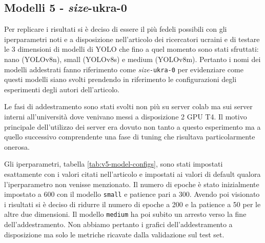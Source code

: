 \subsection*{Modelli 5 - \textit{size}-ukra-0}


Per replicare i risultati si è deciso di essere il più fedeli possibili con gli iperparametri 
noti e a disposizione nell'articolo dei ricercatori ucraini e di testare le 3 dimensioni di modelli
di YOLO che fino a quel momento sono stati sfruttati: nano (YOLOv8n), small (YOLOv8s) e medium (YOLOv8m).
Pertanto i nomi dei modelli addestrati fanno riferimento come \textit{size}\texttt{-ukra-0} per 
evidenziare come questi modelli siano svolti prendendo in riferimento le configurazioni degli 
esperimenti degli autori dell'articolo.

Le fasi di addestramento sono stati svolti non più su server colab ma sui server interni 
all'università dove venivano messi a disposizione 2 GPU T4. Il motivo principale dell'utilizzo dei 
server era dovuto non tanto a questo esperimento ma a quello successivo comprendente una fase di 
tuning che risultava particolarmente onerosa.

Gli iperparametri, tabella \ref{tab:v5-model-configs}, sono stati impostati esattamente con i valori citati nell'articolo e impostati
ai valori di default qualora l'iperparametro non venisse menzionato. Il numero di epoche è stato inizialmente
impostato a 600 con il modello \texttt{small} e patience pari a 300. Avendo poi visionato i 
risultati si è deciso di ridurre il numero di epoche a 200 e la patience a 50 per le altre due 
dimensioni. Il modello \texttt{medium} ha poi subito un arresto verso la fine dell'addestramento. Non 
abbiamo pertanto i grafici dell'addestramento a disposizione ma solo le metriche ricavate dalla validazione
sul test set. 


